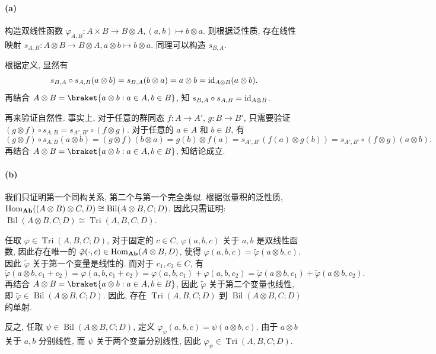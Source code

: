 \documentclass{article}
\begin{document}
\begin{solution}
	\paragraph{(a)} 构造双线性函数 $\varphi_{A, B}: A \times B \to B \otimes A, (a, b) \mapsto b \otimes a$. 则根据泛性质, 存在线性映射 $s_{A, B}: A \otimes B \to B \otimes A, a \otimes b \mapsto b \otimes a$. 同理可以构造 $s_{B, A}$. 

	根据定义, 显然有
	\[ s_{B, A} \circ s_{A, B} (a \otimes b) = s_{B, A}(b \otimes a) = a \otimes b = \operatorname{id}_{A \otimes B}(a \otimes b). \]
	再结合 $A \otimes B = \braket{a \otimes b: a \in A, b \in B}$, 知 $s_{B, A} \circ s_{A, B} = \operatorname{id}_{A \otimes B}$.

	再来验证自然性. 事实上, 对于任意的群同态 $f: A \to A'$, $g: B \to B'$, 只需要验证 $(g \otimes f) \circ s_{A, B} = s_{A', B'} \circ (f \otimes g	)$. 对于任意的 $a \in A$ 和 $b \in B$, 有
	\[ (g \otimes f) \circ s_{A, B} (a \otimes b) = (g \otimes f)(b \otimes a) = g(b) \otimes f(a) = s_{A', B'}(f(a) \otimes g(b)) = s_{A', B'} \circ (f \otimes g)(a \otimes b). \]
	再结合 $A \otimes B = \braket{a \otimes b: a \in A, b \in B}$, 知结论成立.

	\paragraph{(b)} 我们只证明第一个同构关系, 第二个与第一个完全类似. 根据张量积的泛性质, $\operatorname{Hom}_{\mathbf{Ab}}((A \otimes B) \otimes C, D) \cong \operatorname{Bil}(A \otimes B, C; D)$. 因此只需证明: $\operatorname{Bil}(A \otimes B, C; D) \cong \operatorname{Tri}(A, B, C; D)$.

	任取 $\varphi \in \operatorname{Tri}(A, B, C; D)$, 对于固定的 $c \in C$, $\varphi(a, b, c)$ 关于 $a, b$ 是双线性函数, 因此存在唯一的 $\tilde{\varphi}(\cdot, c) \in \operatorname{Hom}_{\mathbf{Ab}}(A \otimes B, D)$, 使得 $\varphi(a, b, c) = \tilde{\varphi}(a \otimes b, c)$. 因此 $\tilde{\varphi}$ 关于第一个变量是线性的. 而对于 $c_1, c_2 \in C$, 有
	\[ \tilde{\varphi}(a \otimes b, c_1 + c_2) = \varphi(a, b, c_1 + c_2) = \varphi(a, b, c_1) + \varphi(a, b, c_2) = \tilde{\varphi}(a \otimes b, c_1) + \tilde{\varphi}(a \otimes b, c_2). \]
	再结合 $A \otimes B = \braket{a \otimes b: a \in A, b \in B}$, 因此 $\tilde{\varphi}$ 关于第二个变量也线性, 即 $\tilde{\varphi} \in \operatorname{Bil}(A \otimes B, C; D)$. 因此, 存在 $\operatorname{Tri}(A, B, C; D)$ 到 $\operatorname{Bil}(A \otimes B, C; D)$ 的单射.

	反之, 任取 $\psi \in \operatorname{Bil}(A \otimes B, C; D)$, 定义 $\varphi_\psi(a, b, c) = \psi(a \otimes b, c)$. 由于 $a \otimes b$ 关于 $a, b$ 分别线性, 而 $\psi$ 关于两个变量分别线性, 因此 $\varphi_\psi \in \operatorname{Tri}(A, B, C; D)$.


\end{solution}
\end{document}
